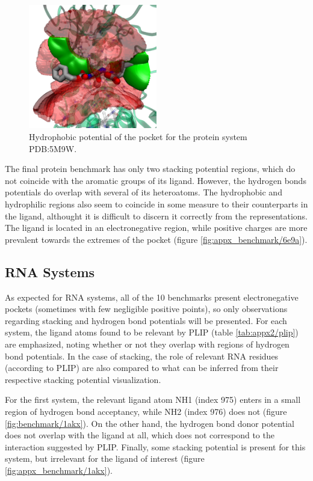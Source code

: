     \begin{figure}[H]
      \centering
      \includegraphics[width=0.5\textwidth]{figures/results/benchmark_prot/5m9w.png}
      \caption{\label{fig:benchmark/5m9w} Hydrophobic potential of the pocket for the protein system PDB:5M9W.}
    \end{figure}

    The final protein benchmark has only two stacking potential regions, which do not coincide with the aromatic groups of its ligand. However, the hydrogen bonds potentials do overlap with several of its heteroatoms. The hydrophobic and hydrophilic regions also seem to coincide in some measure to their counterparts in the ligand, althought it is difficult to discern it correctly from the representations. The ligand is located in an electronegative region, while positive charges are more prevalent towards the extremes of the pocket (figure \ref{fig:appx_benchmark/6e9a}).

  \subsection{RNA Systems}
    As expected for RNA systems, all of the 10 benchmarks present electronegative pockets (sometimes with few negligible positive points), so only observations regarding stacking and hydrogen bond potentials will be presented. For each system, the ligand atoms found to be relevant by PLIP (table \ref{tab:appx2/plip}) are emphasized, noting whether or not they overlap with regions of hydrogen bond potentials. In the case of stacking, the role of relevant RNA residues (according to PLIP) are also compared to what can be inferred from their respective stacking potential visualization.

    For the first system, the relevant ligand atom NH1 (index 975) enters in a small region of hydrogen bond acceptancy, while NH2 (index 976) does not (figure \ref{fig:benchmark/1akx}). On the other hand, the hydrogen bond donor potential does not overlap with the ligand at all, which does not correspond to the interaction suggested by PLIP. Finally, some stacking potential is present for this system, but irrelevant for the ligand of interest (figure \ref{fig:appx_benchmark/1akx}).

